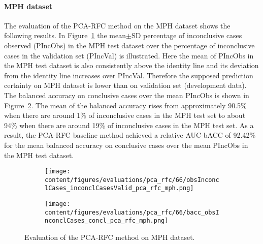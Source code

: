 
\paragraph{MPH dataset}

The evaluation of the PCA-RFC method on the MPH dataset shows the following results.
In Figure~\ref{fig:obsInconclCases_inconclCasesValid_pca_rfc_mph} 
the mean$\pm$SD percentage of inconclusive cases observed (PIncObs) in the MPH test dataset 
over the percentage of inconclusive cases in the validation set (PIncVal) is illustrated.
Here the mean of PIncObs in the MPH test dataset
is also consistently above the identity line and its deviation from the identity line increases over PIncVal.
Therefore the supposed prediction certainty on MPH dataset is lower than on validation set (development data).
The balanced accuracy on conclusive cases over the mean PIncObs is shown 
in Figure~\ref{fig:bacc_obsInconclCases_concl_pca_rfc_mph}.
The mean of the balanced accuracy rises from approximately 90.5\% 
when there are around 1\% of inconclusive cases in the MPH test set to about 94\% 
when there are around 19\% of inconclusive cases in the MPH test set.
As a result, the PCA-RFC baseline method achieved a relative AUC-bACC of 92.42\% for the mean balanced accuracy on conclusive cases 
over the mean PIncObs in the MPH test dataset.


\begin{figure}[ht]
  \begin{subfigure}{0.49\textwidth}
    \centering
    \texttt{[image: content/figures/evaluations/pca\_rfc/66/obsInconclCases\_inconclCasesValid\_pca\_rfc\_mph.png]}
    \label{fig:obsInconclCases_inconclCasesValid_pca_rfc_mph}
  \end{subfigure}
  \hfill
  \begin{subfigure}{0.49\textwidth}
    \centering
    \texttt{[image: content/figures/evaluations/pca\_rfc/66/bacc\_obsInconclCases\_concl\_pca\_rfc\_mph.png]}
    \label{fig:bacc_obsInconclCases_concl_pca_rfc_mph}
  \end{subfigure}
  \caption{Evaluation of the PCA-RFC method on MPH dataset.}
  \label{fig:perf_results_rfc_mph}
\end{figure}


